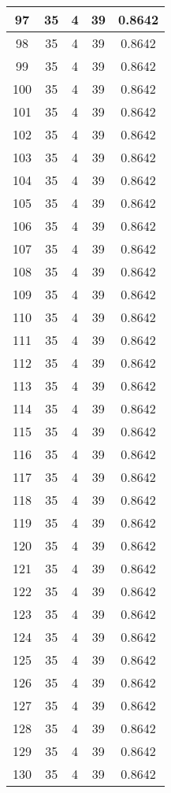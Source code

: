 \documentclass[letterpaper, 12pt]{article}
\begin{document}
\begin{longtable}{|c|c|c|c|c|}
\hline
97 & 35 & 4 & 39 & 0.8642 \\
\hline
98 & 35 & 4 & 39 & 0.8642 \\
\hline
99 & 35 & 4 & 39 & 0.8642 \\
\hline
100 & 35 & 4 & 39 & 0.8642 \\
\hline
101 & 35 & 4 & 39 & 0.8642 \\
\hline
102 & 35 & 4 & 39 & 0.8642 \\
\hline
103 & 35 & 4 & 39 & 0.8642 \\
\hline
104 & 35 & 4 & 39 & 0.8642 \\
\hline
105 & 35 & 4 & 39 & 0.8642 \\
\hline
106 & 35 & 4 & 39 & 0.8642 \\
\hline
107 & 35 & 4 & 39 & 0.8642 \\
\hline
108 & 35 & 4 & 39 & 0.8642 \\
\hline
109 & 35 & 4 & 39 & 0.8642 \\
\hline
110 & 35 & 4 & 39 & 0.8642 \\
\hline
111 & 35 & 4 & 39 & 0.8642 \\
\hline
112 & 35 & 4 & 39 & 0.8642 \\
\hline
113 & 35 & 4 & 39 & 0.8642 \\
\hline
114 & 35 & 4 & 39 & 0.8642 \\
\hline
115 & 35 & 4 & 39 & 0.8642 \\
\hline
116 & 35 & 4 & 39 & 0.8642 \\
\hline
117 & 35 & 4 & 39 & 0.8642 \\
\hline
118 & 35 & 4 & 39 & 0.8642 \\
\hline
119 & 35 & 4 & 39 & 0.8642 \\
\hline
120 & 35 & 4 & 39 & 0.8642 \\
\hline
121 & 35 & 4 & 39 & 0.8642 \\
\hline
122 & 35 & 4 & 39 & 0.8642 \\
\hline
123 & 35 & 4 & 39 & 0.8642 \\
\hline
124 & 35 & 4 & 39 & 0.8642 \\
\hline
125 & 35 & 4 & 39 & 0.8642 \\
\hline
126 & 35 & 4 & 39 & 0.8642 \\
\hline
127 & 35 & 4 & 39 & 0.8642 \\
\hline
128 & 35 & 4 & 39 & 0.8642 \\
\hline
129 & 35 & 4 & 39 & 0.8642 \\
\hline
130 & 35 & 4 & 39 & 0.8642 \\

\end{longtable}
\end{document}
